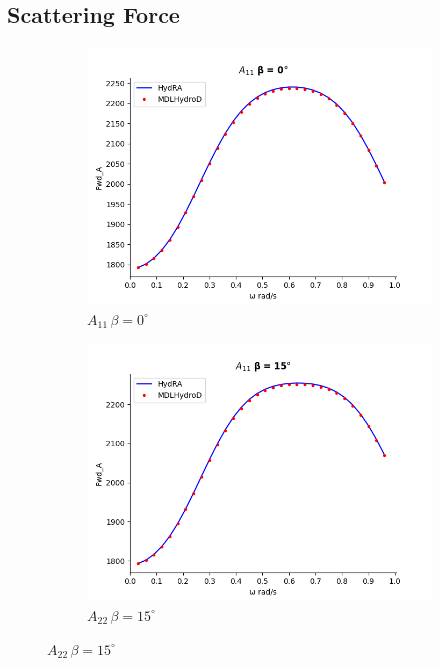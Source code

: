 \subsection{Scattering Force}
\begin{figure}[H]
    \centering
    \begin{subfigure}[b]{0.45\textwidth}
        \includegraphics[width=\textwidth]{plots/kcs/added_mass/A11_BETA_0.png}
        \caption{$A_{11}\, \beta=0^{\circ}$}
    \end{subfigure}
    \begin{subfigure}[b]{0.45\textwidth}
        \includegraphics[width=\textwidth]{plots/kcs/added_mass/A11_BETA_15.png}
        \caption{$A_{22} \, \beta = 15^{\circ}$}
    \end{subfigure}
    \label{fig:kcs_addedmass_5}
\end{figure}



